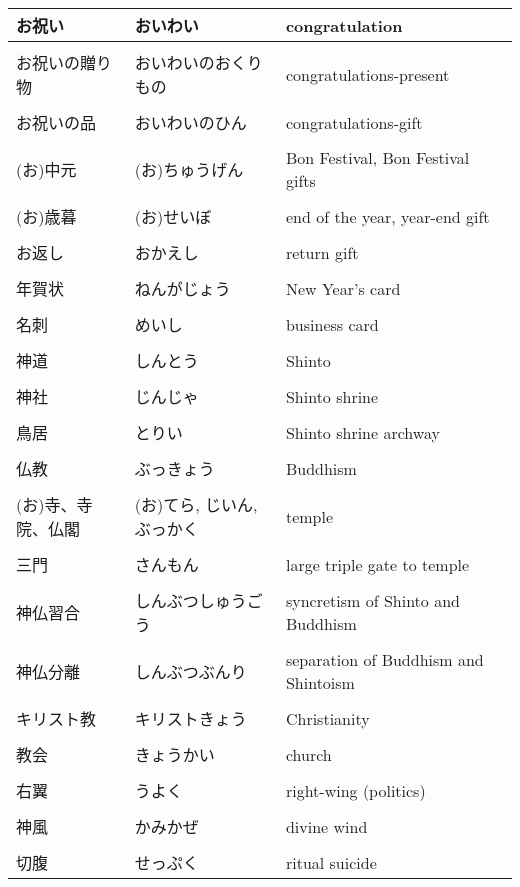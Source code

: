\documentclass{article}
\begin{document}
\begin{tabular}{ l | p{6.7cm} | p{7.5cm} }
お祝い			& おいわい 				& congratulation						\\ \hline \\[-1em]
お祝いの贈り物 		& おいわいのおくりもの 			& congratulations-present				\\ \hline \\[-1em]
お祝いの品 		& おいわいのひん				& congratulations-gift					\\ \hline \\[-1em]
(お)中元			& (お)ちゅうげん 			& Bon Festival, Bon Festival gifts		\\ \hline \\[-1em]
(お)歳暮 			& (お)せいぼ 				& end of the year, year-end gift		\\ \hline \\[-1em]
お返し 			& おかえし 				& return gift							\\ \hline \\[-1em]
年賀状 			& ねんがじょう 				& New Year's card						\\ \hline \\[-1em]
名刺				& めいし 					& business card 						\\ \hline \\[-1em]
神道 			& しんとう 					& Shinto								\\ \hline \\[-1em]
神社 			& じんじゃ 					& Shinto shrine							\\ \hline \\[-1em]
鳥居 			& とりい 					& Shinto shrine archway					\\ \hline \\[-1em]
仏教 			& ぶっきょう 				& Buddhism								\\ \hline \\[-1em]
(お)寺、寺院、仏閣	& (お)てら, じいん, ぶっかく 	& temple								\\ \hline \\[-1em]
三門				& さんもん 				& large triple gate to temple			\\ \hline \\[-1em]
神仏習合			& しんぶつしゅうごう			& syncretism of Shinto and Buddhism		\\ \hline \\[-1em]
神仏分離			& しんぶつぶんり 				& separation of Buddhism and Shintoism	\\ \hline \\[-1em]
キリスト教 			& キリストきょう 				& Christianity							\\ \hline \\[-1em]
教会 			& きょうかい 				& church								\\ \hline \\[-1em]
右翼				& うよく 					& right-wing (politics)					\\ \hline \\[-1em]
神風				& かみかぜ 				& divine wind							\\ \hline \\[-1em]
切腹 			& せっぷく 					& ritual suicide 					   %
\end{tabular}
\end{document}
